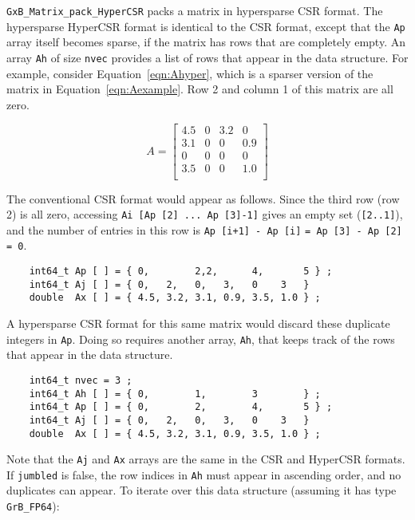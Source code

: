 \documentclass[12pt]{article}
\begin{document}
\verb'GxB_Matrix_pack_HyperCSR' packs a matrix in hypersparse CSR format.
The hypersparse HyperCSR format is identical to the CSR format, except that the
\verb'Ap' array itself becomes sparse, if the matrix has rows that are
completely empty.  An array \verb'Ah' of size \verb'nvec' provides a list of
rows that appear in the data structure.  For example, consider
Equation~\ref{eqn:Ahyper}, which is a sparser version of the matrix in
Equation~\ref{eqn:Aexample}.  Row 2 and column 1 of this matrix are all zero.

    \begin{equation}
    \label{eqn:Ahyper}
    A = \left[
    \begin{array}{cccc}
    4.5 &   0 & 3.2 &   0 \\
    3.1 &   0 &  0  & 0.9 \\
     0  &   0 &  0  &   0 \\
    3.5 &   0 &  0  & 1.0 \\
    \end{array}
    \right]
    \end{equation}

The conventional CSR format would appear as follows.  Since the third row (row
2) is all zero, accessing \verb'Ai [Ap [2] ... Ap [3]-1]' gives an empty set
(\verb'[2..1]'), and the number of entries in this row is
\verb'Ap [i+1] - Ap [i]' \verb'= Ap [3] - Ap [2] = 0'.

{\footnotesize
\begin{verbatim}
    int64_t Ap [ ] = { 0,        2,2,      4,       5 } ;
    int64_t Aj [ ] = { 0,   2,   0,   3,   0    3   }
    double  Ax [ ] = { 4.5, 3.2, 3.1, 0.9, 3.5, 1.0 } ; \end{verbatim} }

A hypersparse CSR format for this same matrix would discard
these duplicate integers in \verb'Ap'.  Doing so requires
another array, \verb'Ah', that keeps track of the rows that appear
in the data structure.

{\footnotesize
\begin{verbatim}
    int64_t nvec = 3 ;
    int64_t Ah [ ] = { 0,        1,        3        } ;
    int64_t Ap [ ] = { 0,        2,        4,       5 } ;
    int64_t Aj [ ] = { 0,   2,   0,   3,   0    3   }
    double  Ax [ ] = { 4.5, 3.2, 3.1, 0.9, 3.5, 1.0 } ; \end{verbatim} }

Note that the \verb'Aj' and \verb'Ax' arrays are the same in the CSR and
HyperCSR formats.  If \verb'jumbled' is false, the row indices in \verb'Ah'
must appear in ascending order, and no duplicates can appear.  To iterate over
this data structure (assuming it has type \verb'GrB_FP64'):
\end{document}
